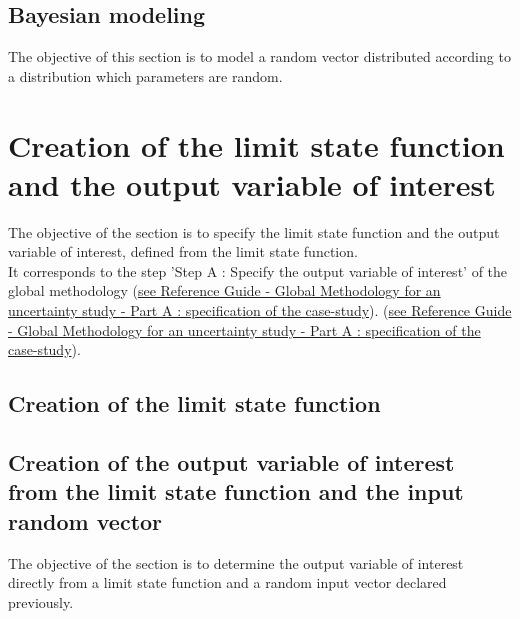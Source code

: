 \newpage \subsection{Bayesian modeling}

The objective of this section is to model a random vector distributed according to a distribution which parameters are random.




\newpage \section{Creation of the limit state function and the output variable of interest}


The objective of the section is to specify the limit state function and the output variable of interest, defined from the limit state function.\\
It corresponds to the step 'Step A : Specify the output variable of interest' of the global methodology
\ifpdf
(\href{OpenTURNS_ReferenceGuide.pdf}{see Reference Guide - Global Methodology for an uncertainty study - Part A : specification of the case-study}).
\else
(\href{../ReferenceGuide/index.xhtml}{see Reference Guide - Global Methodology for an uncertainty study - Part A : specification of the case-study}).
\fi


\subsection{Creation of the limit state function}


\newpage 
\newpage 
\newpage 
\newpage 
\newpage 
\newpage 

\newpage \subsection{Creation of the output variable of interest from the limit state function and the input random  vector}


The objective of the section is to determine the output variable of interest directly from a limit state function and a random input vector declared previously.


